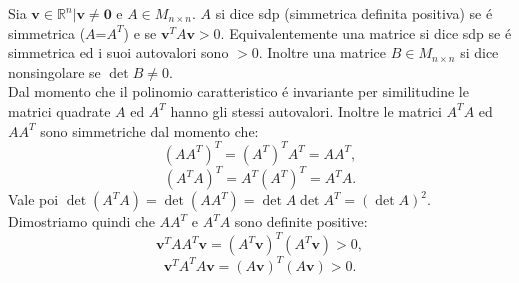 Sia $\mathbf{v} \in \mathbb{R}^n| \mathbf{v} \neq \mathbf{0}$ e $A \in M_{n \times n}$.
$A$ si dice sdp (simmetrica definita positiva) se \'e simmetrica ($A$=$A^T$) e se $\mathbf{v}^TA\mathbf{v} > 0.$
Equivalentemente una matrice si dice sdp se \'e simmetrica ed i suoi autovalori sono $> 0.$
Inoltre una matrice $B \in M_{n \times n}$ si dice nonsingolare se $\det{B} \neq 0.$
\\
Dal momento che il polinomio caratteristico \'e invariante per similitudine le matrici quadrate $A$ ed $A^T$ hanno gli stessi autovalori.
Inoltre le matrici $A^TA$ ed $AA^T$ sono simmetriche dal momento che:
\[
(AA^T)^T = (A^T)^TA^T = AA^T ,\] 
\[
(A^TA)^T = A^T(A^T)^T = A^TA.
\]
Vale poi $\det{(A^TA)} = \det{(AA^T)} = \det{A}\det{A^T} = (\det{A})^2.$
\\
Dimostriamo quindi che $AA^T$ e $A^TA$ sono definite positive:
\[
\mathbf{v}^TAA^T\mathbf{v} = (A^T\mathbf{v})^T(A^T\mathbf{v}) > 0, \]
\[
\mathbf{v}^TA^TA\mathbf{v} = (A\mathbf{v})^T(A\mathbf{v}) > 0.
\]
